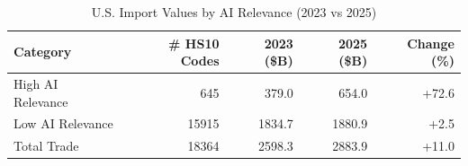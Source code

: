 \begin{table}[htbp]
\centering
\caption{U.S. Import Values by AI Relevance (2023 vs 2025)}
\label{tab:trade_by_relevance}
\setlength{\tabcolsep}{4.5mm}
\renewcommand{\arraystretch}{1.60}
\begin{tabular}{lrrrr}
\toprule
Category & \# HS10 Codes & 2023 (\$B) & 2025 (\$B) & Change (\%) \\
\midrule
High AI Relevance & 645 & 379.0 & 654.0 & +72.6 \\
Low AI Relevance & 15915 & 1834.7 & 1880.9 & +2.5 \\
\midrule
Total Trade & 18364 & 2598.3 & 2883.9 & +11.0 \\
\bottomrule
\end{tabular}
\end{table}
